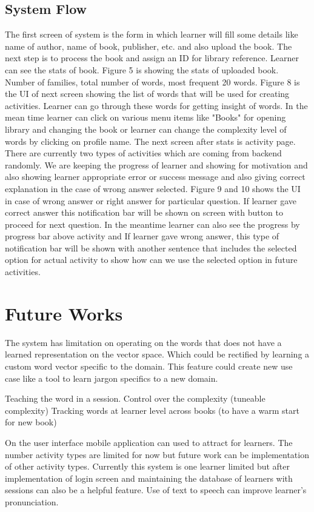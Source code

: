 \documentclass[11pt,a4paper]{article}
\begin{document}
\subsection{System Flow}
The first screen of system is the form in which learner will fill some details like name of author, name of book, publisher, etc. and also upload the book. The next step is to process the book and assign an ID for library reference. Learner can see the stats of book. Figure 5 is showing the stats of uploaded book. Number of families, total number of words, most frequent 20 words. Figure 8 is the UI of next screen showing the list of words that will be used for creating activities. Learner can go through these words for getting insight of words. In the mean time learner can click on various menu items like "Books" for opening library and changing the book or learner can change the complexity level of words by clicking on profile name. The next screen after stats is activity page. There are currently two types of activities which are coming from backend randomly. We are keeping the progress of learner and showing for motivation and also showing learner appropriate error or success message and also giving correct explanation in the case of wrong answer selected. Figure 9 and 10 shows the UI in case of wrong answer or right answer for particular question. If learner gave correct answer this notification bar will be shown on screen with button to proceed for next question. In the meantime learner can also see the progress by progress bar above activity and If learner gave wrong answer, this type of notification bar will be shown with another sentence that includes the selected option for actual activity to show how can we use the selected option in future activities.


\section{Future Works}
The system has limitation on operating on the words that does not have a learned
representation on the vector space. Which could be rectified by learning a
custom word vector specific to the domain. This feature could create new use case
like a tool to learn jargon specifics to a new domain.

Teaching the word in a session.
Control over the complexity (tuneable complexity)
Tracking words at learner level across books (to have a warm start for new book)

On the user interface mobile application can used to attract for learners. The number activity types are limited for now but future work can be implementation of other activity types. Currently this system is one learner limited but after implementation of login screen and maintaining the database of learners with sessions can also be a helpful feature. Use of text to speech can improve learner's pronunciation. 
\end{document}
